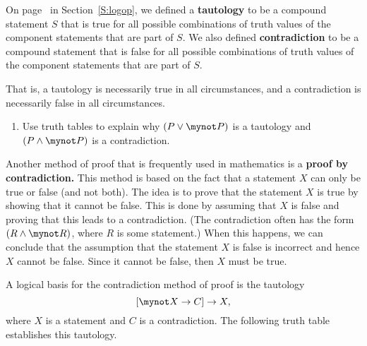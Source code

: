 \begin{previewactivity}\label{PA:contradicton} \hfill
{}%

On page~\pageref{D:tautology} in Section~\ref{S:logop}, we defined
a \textbf{tautology}
%
 to be a compound statement $S$ that is true for all possible combinations of truth values of the component statements that are part of $S$.  We also defined  \textbf{contradiction}
%
 to be a compound statement that is false for all possible combinations of truth values of the component statements that are part of $S$.


That is, a tautology is necessarily true in all circumstances, and a contradiction is necessarily false in all circumstances.

\begin{enumerate}
\item Use truth tables to explain why  $\left( {P \vee \mynot  P} \right)$ is a tautology and $\left( {P \wedge \mynot  P} \right)$ is a contradiction.
\end{enumerate}

Another method of proof that is frequently used in mathematics is a 
\textbf{proof by contradiction.}
%
  This method is based on the fact that a statement  $X$  can only be true or false (and not both).  The idea is to prove that the statement $X$  is true by showing that it cannot be false.  This is done by assuming that  $X$  is false and proving that this leads to a contradiction.  (The contradiction often has the form  
$\left( {R \wedge \mynot  R} \right)$, where  $R$  is some statement.)  When this happens, we can conclude that the assumption that the statement  $X$  is false is incorrect and hence $X$  cannot be false.  Since it cannot be false, then 
$X$  must be true.

A logical basis for the contradiction method of proof is the tautology
\[
\left[ \mynot  X \to C \right] \to X,
\]
where $X$ is a statement and $C$ is a contradiction.  The following truth table establishes this tautology.


\end{previewactivity}

